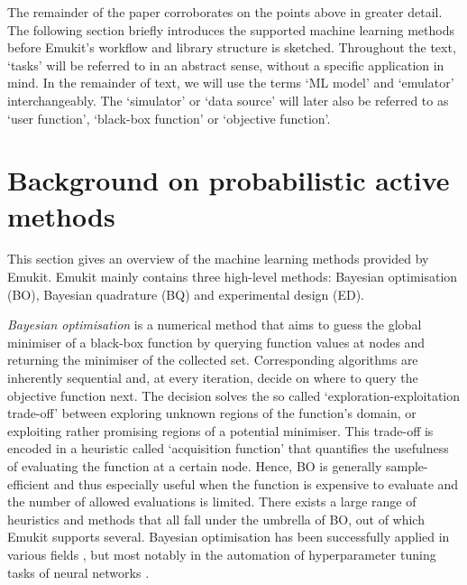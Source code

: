 The remainder of the paper corroborates on the points above in greater detail. The following section briefly introduces the supported machine learning methods before Emukit's workflow and library structure is sketched.
Throughout the text, `tasks' will be referred to in an abstract sense, without a specific application in mind.
In the remainder of text, we will use the terms `ML model' and `emulator' interchangeably. The `simulator' or `data source' will later also be referred to as `user function', `black-box function' or `objective function'.

\section{Background on probabilistic active methods}\label{sec:background}

This section gives an overview of the machine learning methods provided by Emukit.
Emukit mainly contains three high-level methods: Bayesian optimisation (BO), Bayesian quadrature (BQ) and experimental design (ED).

\emph{Bayesian optimisation} \cite{Mockus1978, Garnett2023} is a numerical method that aims to guess the global minimiser of a black-box function by querying function values at nodes and returning the minimiser of the collected set. Corresponding algorithms are inherently sequential and, at every iteration, decide on where to query the objective function next. The decision solves the so called `exploration-exploitation trade-off' between exploring unknown regions of the function's domain, or exploiting rather promising regions of a potential minimiser. This trade-off is encoded in a heuristic called `acquisition function' that quantifies the usefulness of evaluating the function at a certain node. Hence, BO is generally sample-efficient and thus especially useful when the function is expensive to evaluate and the number of allowed evaluations is limited. There exists a large range of heuristics and methods that all fall under the umbrella of BO, out of which Emukit supports several. Bayesian optimisation has been successfully applied in various fields \cite{baheri2017altitude, graff2021accelerating}, but most notably in the automation of hyperparameter tuning tasks of neural networks \cite{snoek2012practical, avent2020automatic}.

